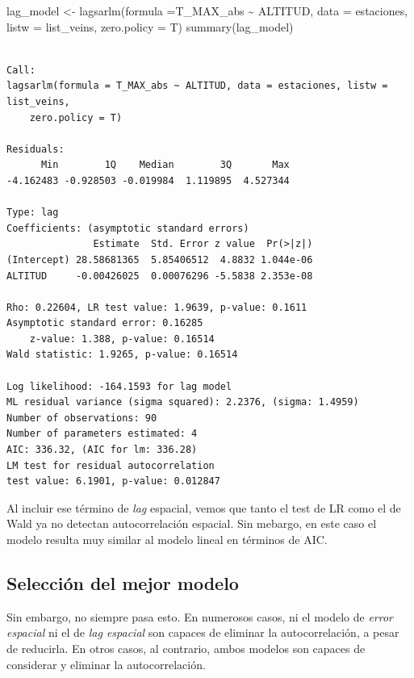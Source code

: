 \documentclass[
  letterpaper,
  DIV=11,
  numbers=noendperiod]{scrreprt}
\newenvironment{Shaded}{\begin{snugshade}}{\end{snugshade}}
\newcommand{\AttributeTok}[1]{\textcolor[rgb]{0.40,0.45,0.13}{#1}}
\newcommand{\FunctionTok}[1]{\textcolor[rgb]{0.28,0.35,0.67}{#1}}
\newcommand{\NormalTok}[1]{\textcolor[rgb]{0.00,0.23,0.31}{#1}}
\newcommand{\OtherTok}[1]{\textcolor[rgb]{0.00,0.23,0.31}{#1}}
\newcommand{\SpecialCharTok}[1]{\textcolor[rgb]{0.37,0.37,0.37}{#1}}
\begin{document}
\begin{Shaded}
\begin{Highlighting}[]
\NormalTok{lag\_model }\OtherTok{\textless{}{-}} \FunctionTok{lagsarlm}\NormalTok{(}\AttributeTok{formula =}\NormalTok{T\_MAX\_abs }\SpecialCharTok{\textasciitilde{}}\NormalTok{ ALTITUD, }\AttributeTok{data =}\NormalTok{ estaciones, }\AttributeTok{listw =}\NormalTok{ list\_veins, }\AttributeTok{zero.policy =}\NormalTok{ T)}
\FunctionTok{summary}\NormalTok{(lag\_model)}
\end{Highlighting}
\end{Shaded}

\begin{verbatim}

Call:
lagsarlm(formula = T_MAX_abs ~ ALTITUD, data = estaciones, listw = list_veins, 
    zero.policy = T)

Residuals:
      Min        1Q    Median        3Q       Max 
-4.162483 -0.928503 -0.019984  1.119895  4.527344 

Type: lag 
Coefficients: (asymptotic standard errors) 
               Estimate  Std. Error z value  Pr(>|z|)
(Intercept) 28.58681365  5.85406512  4.8832 1.044e-06
ALTITUD     -0.00426025  0.00076296 -5.5838 2.353e-08

Rho: 0.22604, LR test value: 1.9639, p-value: 0.1611
Asymptotic standard error: 0.16285
    z-value: 1.388, p-value: 0.16514
Wald statistic: 1.9265, p-value: 0.16514

Log likelihood: -164.1593 for lag model
ML residual variance (sigma squared): 2.2376, (sigma: 1.4959)
Number of observations: 90 
Number of parameters estimated: 4 
AIC: 336.32, (AIC for lm: 336.28)
LM test for residual autocorrelation
test value: 6.1901, p-value: 0.012847
\end{verbatim}

Al incluir ese término de \emph{lag} espacial, vemos que tanto el test
de LR como el de Wald ya no detectan autocorrelación espacial. Sin
mebargo, en este caso el modelo resulta muy similar al modelo lineal en
términos de AIC.

\hypertarget{selecciuxf3n-del-mejor-modelo}{%
\subsection{Selección del mejor
modelo}\label{selecciuxf3n-del-mejor-modelo}}

Sin embargo, no siempre pasa esto. En numerosos casos, ni el modelo de
\emph{error espacial} ni el de \emph{lag espacial} son capaces de
eliminar la autocorrelación, a pesar de reducirla. En otros casos, al
contrario, ambos modelos son capaces de considerar y eliminar la
autocorrelación.
\end{document}
